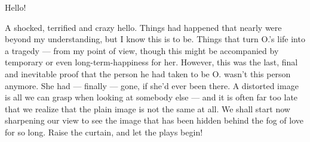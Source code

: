 Hello! 

A shocked, terrified and crazy hello. Things had happened that nearly were beyond my understanding, but I know this is to be. Things that turn O.'s life into a tragedy --- from my point of view, though this might be accompanied by temporary or even long-term-happiness for her. However, this was the last, final and inevitable proof that the person he had taken to be O. wasn't this person anymore. She had --- finally --- gone, if she'd ever been there. 
A distorted image is all we can grasp when looking at somebody else --- and it is often far too late that we realize that the plain image is not the same at all. 
We shall start now sharpening our view to see the image that has been hidden behind the fog of love for so long. 
Raise the curtain, and let the plays begin! 

